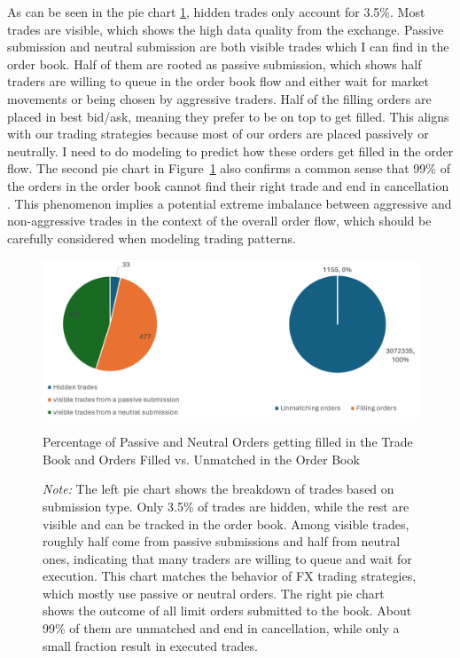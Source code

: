 As can be seen in the pie chart \ref{fig:p_of_AT_unma}, hidden trades only account for 3.5\%. Most trades are visible, which shows the high data quality from the exchange. Passive submission and neutral submission are both visible trades which I can find in the order book. Half of them are rooted as passive submission, which shows half traders are willing to queue in the order book flow and either wait for market movements or being chosen by aggressive traders. Half of the filling orders are placed in best bid/ask, meaning they prefer to be on top to get filled. This aligns with our trading strategies because most of our orders are placed passively or neutrally. I need to do modeling to predict how these orders get filled in the order flow. The second pie chart in Figure~\ref{fig:p_of_AT_unma} also confirms a common sense that 99\% of the orders in the order book cannot find their right trade and end in cancellation \citep{gould_limit_2013}. This phenomenon implies a potential extreme imbalance between aggressive and non-aggressive trades in the context of the overall order flow, which should be carefully considered when modeling trading patterns.

\begin{figure}[h]
    \centering
    \includegraphics[width=0.8\linewidth]{figures/percentage_of_AT_unmatch.png}
    \caption{Percentage of Passive and Neutral Orders getting filled in the Trade Book and Orders Filled vs. Unmatched in the Order Book}
    \caption*{\textit{Note:} The left pie chart shows the breakdown of trades based on submission type. Only 3.5\% of trades are hidden, while the rest are visible and can be tracked in the order book. Among visible trades, roughly half come from passive submissions and half from neutral ones, indicating that many traders are willing to queue and wait for execution. This chart matches the behavior of FX trading strategies, which mostly use passive or neutral orders. The right pie chart shows the outcome of all limit orders submitted to the book. About 99\% of them are unmatched and end in cancellation, while only a small fraction result in executed trades.}
    \label{fig:p_of_AT_unma}
\end{figure}


